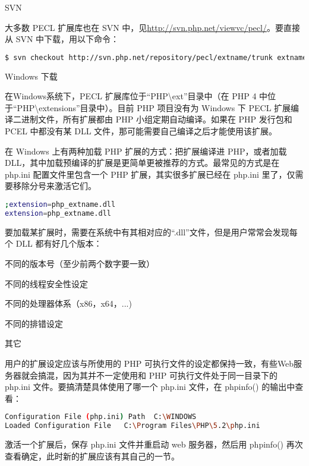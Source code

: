 \begin{compactitem}
\item SVN

大多数 PECL 扩展库也在 SVN 中，见\url{http://svn.php.net/viewvc/pecl/}。要直接从 SVN 中下载，用以下命令：

\begin{lstlisting}[language=bash]
$ svn checkout http://svn.php.net/repository/pecl/extname/trunk extname
\end{lstlisting}

\item Windows 下载

在Windows系统下，PECL 扩展库位于“PHP{\textbackslash}ext”目录中（在 PHP 4 中位于“PHP{\textbackslash}extensions”目录中）。目前 PHP 项目没有为 Windows 下 PECL 扩展编译二进制文件，所有扩展都由 PHP 小组定期自动编译。如果在 PHP 发行包和 PCEL 中都没有某 DLL 文件，那可能需要自己编译之后才能使用该扩展。

在 Windows 上有两种加载 PHP 扩展的方式：把扩展编译进 PHP，或者加载 DLL，其中加载预编译的扩展是更简单更被推荐的方式。最常见的方式是在 php.ini 配置文件里包含一个 PHP 扩展，其实很多扩展已经在 php.ini 里了，仅需要移除分号来激活它们。

\begin{lstlisting}[language=bash]
;extension=php_extname.dll
extension=php_extname.dll
\end{lstlisting}

要加载某扩展时，需要在系统中有其相对应的“.dll”文件，但是用户常常会发现每个 DLL 都有好几个版本：

\begin{compactitem}
\item 不同的版本号（至少前两个数字要一致）
\item 不同的线程安全性设定
\item 不同的处理器体系（x86，x64，...)
\item 不同的排错设定
\item 其它
\end{compactitem}

用户的扩展设定应该与所使用的 PHP 可执行文件的设定都保持一致，有些Web服务器就会搞混，因为其并不一定使用和 PHP 可执行文件处于同一目录下的 php.ini 文件。要搞清楚具体使用了哪一个 php.ini 文件，在 phpinfo() 的输出中查看：


\begin{lstlisting}[language=bash]
Configuration File (php.ini) Path  C:\WINDOWS
Loaded Configuration File   C:\Program Files\PHP\5.2\php.ini
\end{lstlisting}

激活一个扩展后，保存 php.ini 文件并重启动 web 服务器，然后用 phpinfo() 再次查看确定，此时新的扩展应该有其自己的一节。


\end{compactitem}
